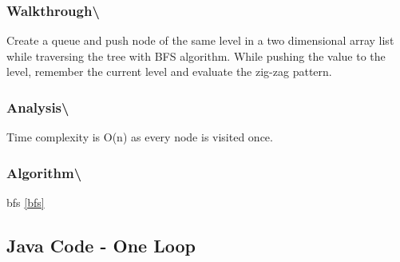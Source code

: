 \documentclass[]{book}
\begin{document}
\hypertarget{walkthrough-60}{%
\subsubsection{Walkthrough\textbackslash{}}\label{walkthrough-60}}

Create a queue and push node of the same level in a two dimensional array list while traversing the tree with
BFS algorithm. While pushing the value to the level, remember the current level and evaluate the zig-zag pattern.

\hypertarget{analysis-67}{%
\subsubsection{Analysis\textbackslash{}}\label{analysis-67}}

Time complexity is O(n) as every node is visited once.

\hypertarget{algorithm-69}{%
\subsubsection{Algorithm\textbackslash{}}\label{algorithm-69}}

bfs \ref{bfs}

\hypertarget{java-code---one-loop-1}{%
\subsection{Java Code - One Loop}\label{java-code---one-loop-1}}
\end{document}
